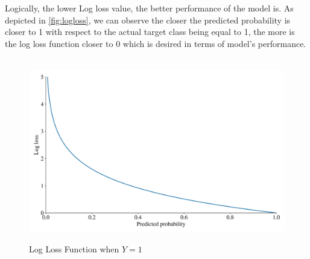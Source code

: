 Logically, the lower Log loss value, the better performance of the model is. As depicted in \autoref{fig:logloss}, we can observe the closer the predicted probability is closer to 1 with respect to the actual target class being equal to 1, the more is the log loss function closer to 0 which is desired in terms of model's performance.
\begin{figure}[H]
    \centering
    \caption{Log Loss Function when $Y=1$}\vspace{0.5em}
    \label{fig:logloss}\
    \includegraphics[width=130mm]{Figures/logloss.jpg}
    \vspace{-1em}
\end{figure}
